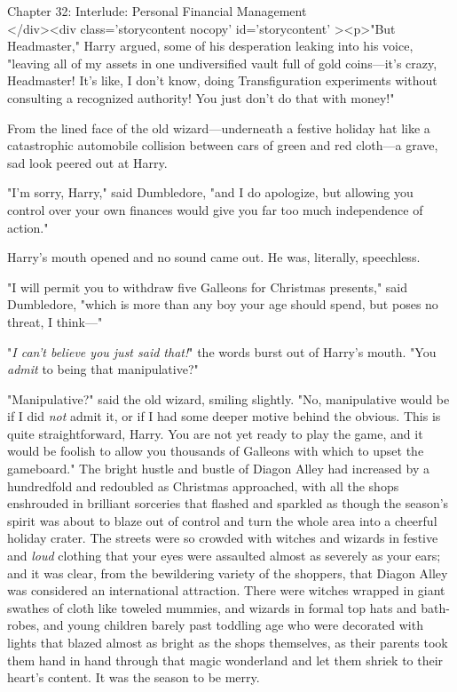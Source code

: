 
Chapter 32: Interlude: Personal Financial Management\\
</div><div  class='storycontent nocopy' id='storycontent' ><p>"But Headmaster," 
Harry argued, some of his desperation leaking into his voice, "leaving all of 
my assets in one undiversified vault full of gold coins---it's crazy, 
Headmaster! It's like, I don't know, doing Transfiguration experiments without 
consulting a recognized authority! You just don't do that with money!"

From the lined face of the old wizard---underneath a festive holiday hat like a 
catastrophic automobile collision between cars of green and red cloth---a 
grave, sad look peered out at Harry.

"I'm sorry, Harry," said Dumbledore, "and I do apologize, but allowing you 
control over your own finances would give you far too much independence of 
action."

Harry's mouth opened and no sound came out. He was, literally, speechless.

"I will permit you to withdraw five Galleons for Christmas presents," said 
Dumbledore, "which is more than any boy your age should spend, but poses no 
threat, I think---"

"\emph{I can't believe you just said that!}" the words burst out of Harry's 
mouth. "You \emph{admit} to being that manipulative?"

"Manipulative?" said the old wizard, smiling slightly. "No, manipulative would 
be if I did \emph{not} admit it, or if I had some deeper motive behind the 
obvious. This is quite straightforward, Harry. You are not yet ready to play 
the game, and it would be foolish to allow you thousands of Galleons with which 
to upset the gameboard."
\sbreak
The bright hustle and bustle of Diagon Alley had increased by a hundredfold and 
redoubled as Christmas approached, with all the shops enshrouded in brilliant 
sorceries that flashed and sparkled as though the season's spirit was about to 
blaze out of control and turn the whole area into a cheerful holiday crater. 
The streets were so crowded with witches and wizards in festive and \emph{loud} 
clothing that your eyes were assaulted almost as severely as your ears; and it 
was clear, from the bewildering variety of the shoppers, that Diagon Alley was 
considered an international attraction. There were witches wrapped in giant 
swathes of cloth like toweled mummies, and wizards in formal top hats and 
bath-robes, and young children barely past toddling age who were decorated with 
lights that blazed almost as bright as the shops themselves, as their parents 
took them hand in hand through that magic wonderland and let them shriek to 
their heart's content. It was the season to be merry.

